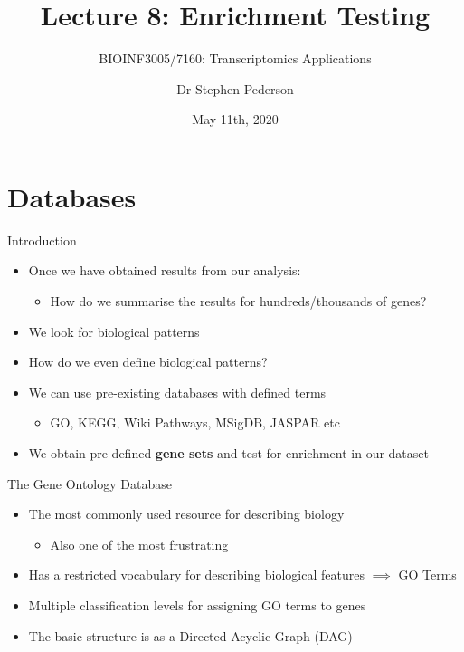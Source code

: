 \documentclass[aspectratio=169,11pt]{beamer}
\author{Dr Stephen Pederson}
\title{Lecture 8: Enrichment Testing}
\subtitle{BIOINF3005/7160: Transcriptomics Applications}
\institute{Bioinformatics Hub, \\The University of Adelaide}
\date{May 11th, 2020}
\begin{document}
\begin{frame}
\titlepage
\end{frame}

\begin{frame}
\footnotesize
\tableofcontents
\end{frame}

\section{Databases}

\begin{frame}{Introduction}

	\begin{itemize}
		\item Once we have obtained results from our analysis:
		\begin{itemize}
			\item How do we summarise the results for hundreds/thousands of genes?
		\end{itemize}
		\item We look for biological patterns
		\item How do we even define biological patterns?
		\item We can use pre-existing databases with defined terms
		\begin{itemize}
			\item GO, KEGG, Wiki Pathways, MSigDB, JASPAR etc
		\end{itemize}
		\item We obtain pre-defined \textbf{gene sets} and test for enrichment in our dataset
	\end{itemize}

\end{frame}


\begin{frame}{The Gene Ontology Database}

	\begin{itemize}
		\item The most commonly used resource for describing biology
		\begin{itemize}
			\item Also one of the most frustrating		
		\end{itemize}
		\item Has a restricted vocabulary for describing biological features $\implies$ GO Terms
		\item Multiple classification levels for assigning GO terms to genes
		\item The basic structure is as a Directed Acyclic Graph (DAG)
	\end{itemize}
	
\end{frame}
\end{document}
